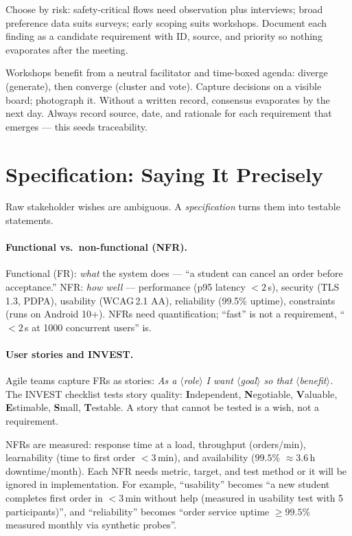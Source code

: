 Choose by risk: safety-critical flows need observation plus interviews; broad preference data suits surveys; early scoping suits workshops. Document each finding as a candidate requirement with ID, source, and priority so nothing evaporates after the meeting.

Workshops benefit from a neutral facilitator and time-boxed agenda: diverge (generate), then converge (cluster and vote). Capture decisions on a visible board; photograph it. Without a written record, consensus evaporates by the next day. Always record source, date, and rationale for each requirement that emerges --- this seeds traceability.

\section{Specification: Saying It Precisely}
\label{sec:specification}
Raw stakeholder wishes are ambiguous. A \emph{specification} turns them into testable statements.

\paragraph{Functional vs.\ non-functional (NFR).} Functional (FR): \emph{what} the system does --- ``a student can cancel an order before acceptance.'' NFR: \emph{how well} --- performance (p95 latency $<2$\,s), security (TLS\,1.3, PDPA), usability (WCAG\,2.1 AA), reliability (99.5\% uptime), constraints (runs on Android 10+). NFRs need quantification; ``fast'' is not a requirement, ``$<2$\,s at 1000 concurrent users'' is.

\paragraph{User stories and INVEST.} Agile teams capture FRs as stories: \emph{As a $\langle$role$\rangle$ I want $\langle$goal$\rangle$ so that $\langle$benefit$\rangle$.} The INVEST checklist tests story quality: \textbf{I}ndependent, \textbf{N}egotiable, \textbf{V}aluable, \textbf{E}stimable, \textbf{S}mall, \textbf{T}estable. A story that cannot be tested is a wish, not a requirement.

NFRs are measured: response time at a load, throughput (orders/min), learnability (time to first order $<3$\,min), and availability ($99.5\%$ $\approx 3.6$\,h downtime/month). Each NFR needs metric, target, and test method or it will be ignored in implementation.
For example, ``usability'' becomes ``a new student completes first order in $<3$\,min without help (measured in usability test with 5 participants)'', and ``reliability'' becomes ``order service uptime $\ge 99.5\%$ measured monthly via synthetic probes''.

